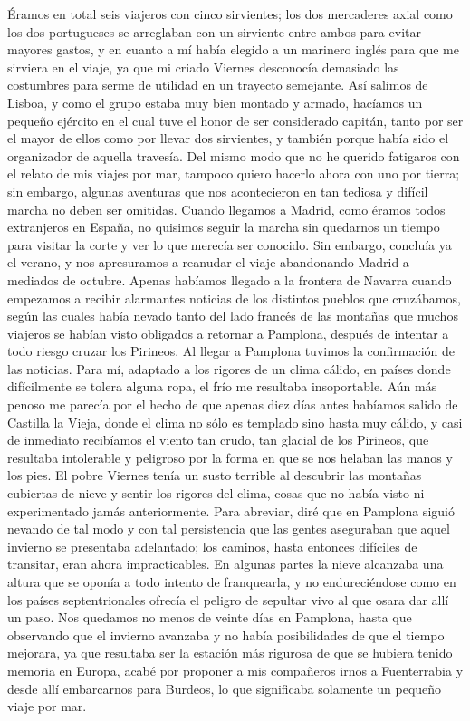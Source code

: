 \documentclass{novela}
\begin{document}
    Éramos en total seis viajeros con cinco sirvientes; los dos mercaderes axial como los dos portugueses se arreglaban con un sirviente entre ambos para evitar mayores gastos, y en cuanto a mí había elegido a un marinero inglés para que me sirviera en el viaje, ya que mi criado Viernes desconocía demasiado las costumbres para serme de utilidad en un trayecto semejante.
    Así salimos de Lisboa, y como el grupo estaba muy bien montado y armado, hacíamos un pequeño ejército en el cual tuve el honor de ser considerado capitán, tanto por ser el mayor de ellos como por llevar dos sirvientes, y también porque había sido el organizador de aquella travesía.
    Del mismo modo que no he querido fatigaros con el relato de mis viajes por mar, tampoco quiero hacerlo ahora con uno por tierra; sin embargo, algunas aventuras que nos acontecieron en tan tediosa y difícil marcha no deben ser omitidas.
    Cuando llegamos a Madrid, como éramos todos extranjeros en España, no quisimos seguir la marcha sin quedarnos un tiempo para visitar la corte y ver lo que merecía ser conocido. Sin embargo, concluía ya el verano, y nos apresuramos a reanudar el viaje abandonando Madrid a mediados de octubre. Apenas habíamos llegado a la frontera de Navarra cuando empezamos a recibir alarmantes noticias de los distintos pueblos que cruzábamos, según las cuales había nevado tanto del lado francés de las montañas que muchos viajeros se habían visto obligados a retornar a Pamplona, después de intentar a todo riesgo cruzar los Pirineos.
    Al llegar a Pamplona tuvimos la confirmación de las noticias. Para mí, adaptado a los rigores de un clima cálido, en países donde difícilmente se tolera alguna ropa, el frío me resultaba insoportable. Aún más penoso me parecía por el hecho de que apenas diez días antes habíamos salido de Castilla la Vieja, donde el clima no sólo es templado sino hasta muy cálido, y casi de inmediato recibíamos el viento tan crudo, tan glacial de los Pirineos, que resultaba intolerable y peligroso por la forma en que se nos helaban las manos y los pies.
    El pobre Viernes tenía un susto terrible al descubrir las montañas cubiertas de nieve y sentir los rigores del clima, cosas que no había visto ni experimentado jamás anteriormente.
    Para abreviar, diré que en Pamplona siguió nevando de tal modo y con tal persistencia que las gentes aseguraban que aquel invierno se presentaba adelantado; los caminos, hasta entonces difíciles de transitar, eran ahora impracticables. En algunas partes la nieve alcanzaba una altura que se oponía a todo intento de franquearla, y no endureciéndose como en los países septentrionales ofrecía el peligro de sepultar vivo al que osara dar allí un paso. Nos quedamos no menos de veinte días en Pamplona, hasta que observando que el invierno avanzaba y no había posibilidades de que el tiempo mejorara, ya que resultaba ser la estación más rigurosa de que se hubiera tenido memoria en Europa, acabé por proponer a mis compañeros irnos a Fuenterrabia y desde allí embarcarnos para Burdeos, lo que significaba solamente un pequeño viaje por mar.
\end{document}
